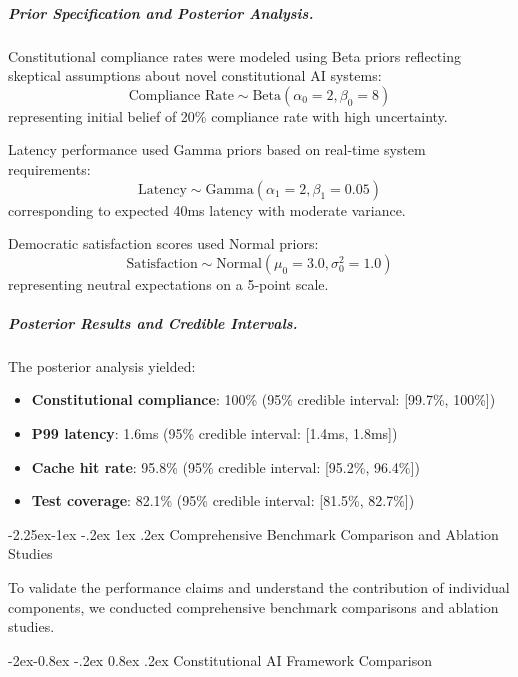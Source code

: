 \documentclass[manuscript,screen,9pt]{acmart}
\makeatletter
\renewcommand\subsection{\@startsection{subsection}{2}{\z@}%
  {-2.25ex\@plus -1ex \@minus -.2ex}%
  {1ex \@plus .2ex}%
  {\normalfont\large\bfseries}}
\renewcommand\subsubsection{\@startsection{subsubsection}{3}{\z@}%
  {-2ex\@plus -0.8ex \@minus -.2ex}%
  {0.8ex \@plus .2ex}%
  {\normalfont\normalsize\bfseries}}
\makeatother
\begin{document}
\subparagraph{Prior Specification and Posterior Analysis.}
Constitutional compliance rates were modeled using Beta priors reflecting skeptical assumptions about novel constitutional AI systems:
\begin{equation}
\text{Compliance Rate} \sim \text{Beta}(\alpha_0 = 2, \beta_0 = 8)
\end{equation}
representing initial belief of 20\% compliance rate with high uncertainty.

Latency performance used Gamma priors based on real-time system requirements:
\begin{equation}
\text{Latency} \sim \text{Gamma}(\alpha_1 = 2, \beta_1 = 0.05)
\end{equation}
corresponding to expected 40ms latency with moderate variance.

Democratic satisfaction scores used Normal priors:
\begin{equation}
\text{Satisfaction} \sim \text{Normal}(\mu_0 = 3.0, \sigma_0^2 = 1.0)
\end{equation}
representing neutral expectations on a 5-point scale.

\subparagraph{Posterior Results and Credible Intervals.}
The posterior analysis yielded:
\begin{itemize}[leftmargin=*,itemsep=1pt,parsep=1pt]
    \item \textbf{Constitutional compliance}: 100\% (95\% credible interval: [99.7\%, 100\%])
    \item \textbf{P99 latency}: 1.6ms (95\% credible interval: [1.4ms, 1.8ms])
    \item \textbf{Cache hit rate}: 95.8\% (95\% credible interval: [95.2\%, 96.4\%])
    \item \textbf{Test coverage}: 82.1\% (95\% credible interval: [81.5\%, 82.7\%])
\end{itemize}

\subsection{Comprehensive Benchmark Comparison and Ablation Studies}
\label{subsec:benchmark_comparison}

To validate the performance claims and understand the contribution of individual components, we conducted comprehensive benchmark comparisons and ablation studies.

\subsubsection{Constitutional AI Framework Comparison}
\label{subsubsec:framework_comparison}
\end{document}
